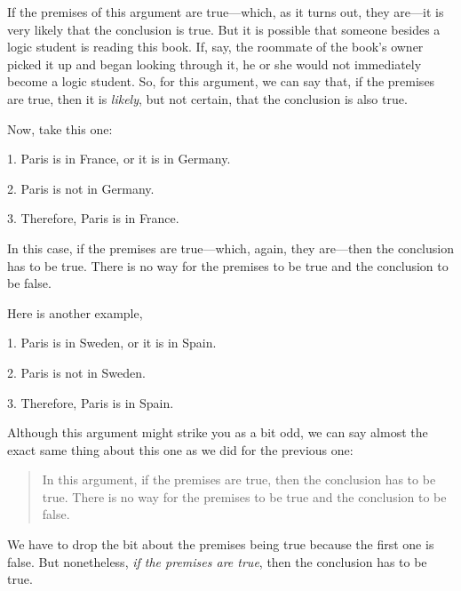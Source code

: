 \noindent If the premises of this argument are true---which, as it turns out, they are---it is very likely that the conclusion is true. But it is possible that someone besides a logic student is reading this book. If, say, the roommate of the book's owner picked it up and began looking through it, he or she would not immediately become a logic student. So, for this argument, we can say that, if the premises are true, then it is \textit{likely}, but not certain, that the conclusion is also true. 

Now, take this one:
	\begin{earg}\label{valid-bananas}
		\item[1.] Paris is in France, or it is in Germany.
		\item[2.] Paris is not in Germany.
		\item[3.] Therefore, Paris is in France.
	\end{earg}
In this case, if the premises are true---which, again, they are---then the conclusion has to be true. There is no way for the premises to be true and the conclusion to be false. 

Here is another example,
\smallskip

\noindent\begin{minipage}{0.99\textwidth}
	\begin{earg}
		\item[1.] Paris is in Sweden, or it is in Spain.
		\item[2.] Paris is not in Sweden. 
		\item[3.] Therefore, Paris is in Spain.
	\end{earg}
\smallskip
\end{minipage}

\noindent Although this argument might strike you as a bit odd, we can say almost the exact same thing about this one as we did for the previous one:
\begin{quote}
In this argument, if the premises are true, then the conclusion has to be true. There is no way for the premises to be true and the conclusion to be false. 
\end{quote}
We have to drop the bit about the premises being true because the first one is false. But nonetheless, \textit{if the premises are true}, then the conclusion has to be true. 


